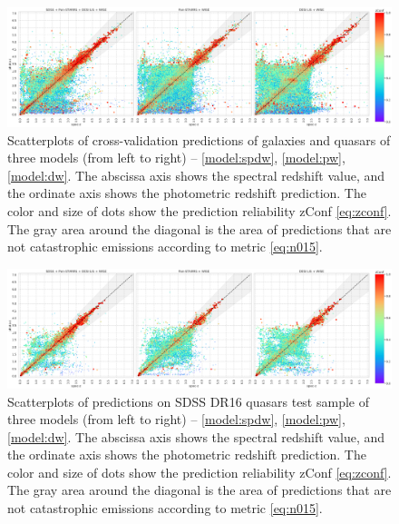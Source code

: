 \documentclass[fleqn,usenatbib]{mnras}
\begin{document}
\begin{figure}
    \centering
    \includegraphics[width=0.9\linewidth]{images/scatterplots-cv2-total.png}
    \caption{Scatterplots of cross-validation predictions of galaxies and quasars of three models (from left to right) -- \ref{model:spdw}, \ref{model:pw}, \ref{model:dw}. The abscissa axis shows the spectral redshift value, and the ordinate axis shows the photometric redshift prediction. The color and size of dots show the prediction reliability zConf \eqref{eq:zconf}. The gray area around the diagonal is the area of predictions that are not catastrophic emissions according to metric \eqref{eq:n015}.}
    \label{fig:scatter-cv2-total}
\end{figure}

\begin{figure}
    \centering
    \includegraphics[width=0.9\linewidth]{images/scatterplots-dr16q-wo-train.png}
    \caption{Scatterplots of predictions on SDSS DR16 quasars test sample of three models (from left to right) -- \ref{model:spdw}, \ref{model:pw}, \ref{model:dw}. The abscissa axis shows the spectral redshift value, and the ordinate axis shows the photometric redshift prediction. The color and size of dots show the prediction reliability zConf \eqref{eq:zconf}. The gray area around the diagonal is the area of predictions that are not catastrophic emissions according to metric \eqref{eq:n015}.}
    \label{fig:scatter-dr16q_wo_train}
\end{figure}
\end{document}
